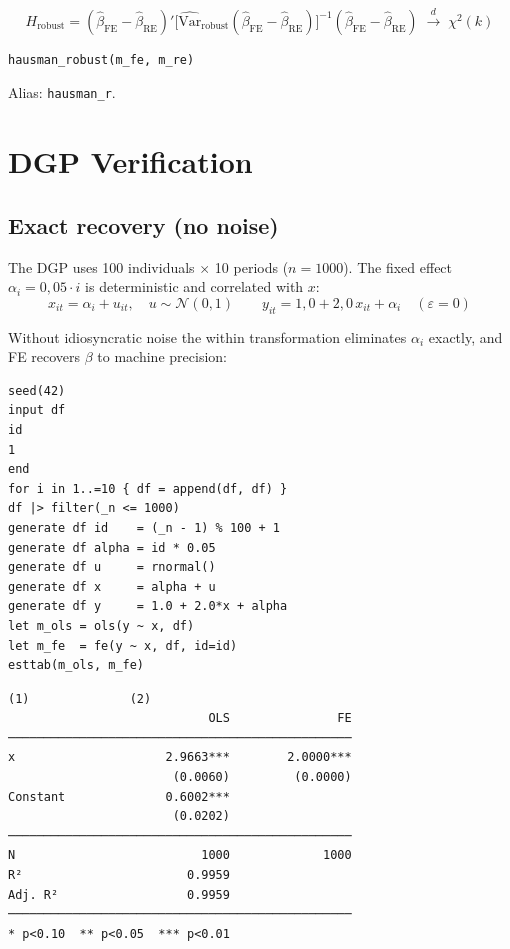 \[
  H_{\mathrm{robust}} = (\hat\beta_{\mathrm{FE}} - \hat\beta_{\mathrm{RE}})'
      \bigl[\widehat{\mathrm{Var}}_{\mathrm{robust}}(\hat\beta_{\mathrm{FE}} -
             \hat\beta_{\mathrm{RE}})\bigr]^{-1}
      (\hat\beta_{\mathrm{FE}} - \hat\beta_{\mathrm{RE}})
  \;\xrightarrow{d}\; \chi^2(k)
\]

\begin{lstlisting}[caption={Robust Hausman test}]
hausman_robust(m_fe, m_re)
\end{lstlisting}

Alias: \texttt{hausman\_r}.

\section{DGP Verification}

\subsection*{Exact recovery (no noise)}

The DGP uses 100 individuals $\times$ 10 periods ($n = 1000$). The fixed effect
$\alpha_i = 0{,}05\cdot i$ is deterministic and correlated with $x$:
\[
  x_{it} = \alpha_i + u_{it},\quad u \sim \mathcal{N}(0,1)
  \qquad
  y_{it} = 1{,}0 + 2{,}0\,x_{it} + \alpha_i \quad(\varepsilon = 0)
\]

Without idiosyncratic noise the within transformation eliminates $\alpha_i$
exactly, and FE recovers $\beta$ to machine precision:

\begin{lstlisting}[caption={FE with correlated fixed effect --- no noise}]
seed(42)
input df
id
1
end
for i in 1..=10 { df = append(df, df) }
df |> filter(_n <= 1000)
generate df id    = (_n - 1) % 100 + 1
generate df alpha = id * 0.05
generate df u     = rnormal()
generate df x     = alpha + u
generate df y     = 1.0 + 2.0*x + alpha
let m_ols = ols(y ~ x, df)
let m_fe  = fe(y ~ x, df, id=id)
esttab(m_ols, m_fe)
\end{lstlisting}

\begin{lstlisting}[language={}, basicstyle=\ttfamily\small,
  frame=none, numbers=none, backgroundcolor=\color{codbg},
  xleftmargin=0pt, xrightmargin=0pt, breaklines=false]
                            (1)              (2)
                            OLS               FE
────────────────────────────────────────────────
x                     2.9663***        2.0000***
                       (0.0060)         (0.0000)
Constant              0.6002***
                       (0.0202)
────────────────────────────────────────────────
N                          1000             1000
R²                       0.9959
Adj. R²                  0.9959
────────────────────────────────────────────────
* p<0.10  ** p<0.05  *** p<0.01
\end{lstlisting}

